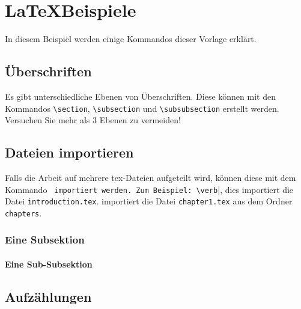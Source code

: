 
\chapter{\LaTeX Beispiele}\label{chap2}

In diesem Beispiel werden einige Kommandos dieser Vorlage erklärt.

\section{Überschriften}\label{chap2_headings}

Es gibt unterschiedliche Ebenen von Überschriften. Diese können mit den Kommandos \verb|\section|, \verb|\subsection| und \verb|\subsubsection| erstellt werden. Versuchen Sie mehr als 3 Ebenen zu vermeiden!

\section{Dateien importieren}

Falls die Arbeit auf mehrere tex-Dateien aufgeteilt wird, können diese mit dem Kommando \verb| importiert werden. Zum Beispiel: \verb||, dies importiert die Datei \texttt{introduction.tex}. \verb|| importiert die Datei \texttt{chapter1.tex} aus dem Ordner \texttt{chapters}.

\subsection{Eine Subsektion}

\lipsum

\subsubsection{Eine Sub-Subsektion}

\lipsum

\section{Aufzählungen}\label{sec:enums}

